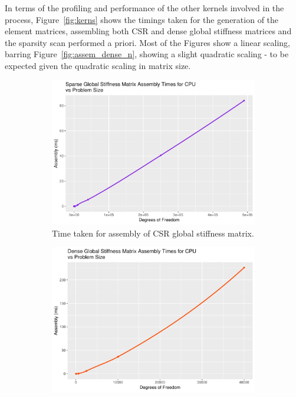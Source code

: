In terms of the profiling and performance of the other kernels involved in the process, Figure~\ref{fig:kerns} shows the timings taken for the generation of the element matrices, assembling both CSR and dense global stiffness matrices and the sparsity scan performed a priori. Most of the Figures show a linear scaling, barring Figure~\ref{fig:assem_dense_n}, showing a slight quadratic scaling - to be expected given the quadratic scaling in matrix size.

\begin{figure}
	\centering
	\begin{subfigure}{0.48\linewidth}
		\centering
		\includegraphics[width = \linewidth]{Plots/assembly_sparse_cpu}
		\caption{Time taken for assembly of CSR global stiffness matrix.}
		\label{fig:assem_sparse}
	\end{subfigure}\hfill
	\begin{subfigure}{0.48\linewidth}
		\centering
		\includegraphics[width=\linewidth]{Plots/assembly_dense_cpu}

\end{subfigure}
\end{figure}
